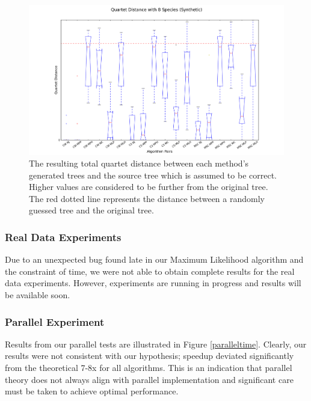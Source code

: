 \documentclass[10pt,twocolumn]{article}
\begin{document}
   \begin{figure} %
    \vspace{0 mm}
    \hspace{-37mm}
	\includegraphics[scale=.72]{./media/8quartetSynthetic.png}
	\caption{The resulting total quartet distance between each method's generated trees and the source tree which is assumed to be correct. Higher values are considered to be further from the original tree. The red dotted line represents the distance between a randomly guessed tree and the original tree.} %
	\label{8quartetSynthetic}

  \end{figure}

\subsubsection*{Real Data Experiments}
Due to an unexpected bug found late in our Maximum Likelihood algorithm and the constraint of time, we were not able to obtain complete results for the real data experiments. However, experiments are running in progress and results will be available soon.

\subsubsection*{Parallel Experiment}

Results from our parallel tests are illustrated in Figure \ref{paralleltime}. Clearly, our results were not consistent with our hypothesis; speedup deviated significantly from the theoretical 7-8x for all algorithms. This is an indication that parallel theory does not always align with parallel implementation and significant care must be taken to achieve optimal performance.
\end{document}
